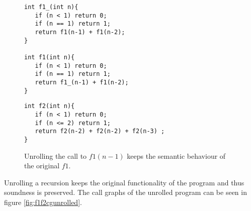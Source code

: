 \begin{figure}[h]
\begin{center}
\begin{minipage}{7 cm}
\begin{lstlisting}
int f1_(int n){
   if (n < 1) return 0;
   if (n == 1) return 1; 
   return f1(n-1) + f1(n-2);
}

int f1(int n){
   if (n < 1) return 0;
   if (n == 1) return 1; 
   return f1_(n-1) + f1(n-2);
}
\end{lstlisting}
\end{minipage}
\begin{minipage}{7 cm}
\begin{lstlisting}
int f2(int n){
   if (n < 1) return 0;
   if (n <= 2) return 1;
   return f2(n-2) + f2(n-2) + f2(n-3) ;
}
\end{lstlisting}
\end{minipage}
\caption{Unrolling the call to $f1(n-1)$ keeps the semantic behaviour of the original $f1$.}
\label{fig:f1f2unrolled}
\end{center}
\end{figure}
 Unrolling a recursion keeps the original functionality of the program and thus soundness is preserved. The call graphs of the unrolled program can be seen in figure \ref{fig:f1f2cgunrolled}. 
